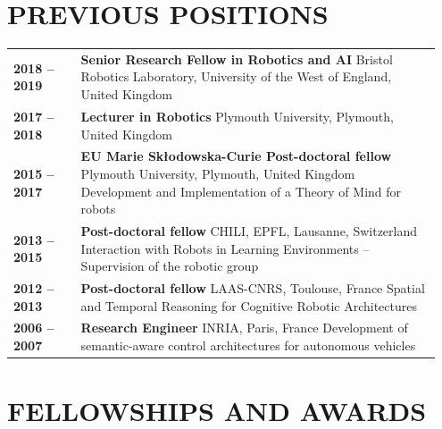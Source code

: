 \documentclass[11pt,a4paper]{report}
\begin{document}
\section{PREVIOUS POSITIONS}

\begin{tabular}{p{0.15\linewidth}p{0.8\linewidth}}
    \bf 2018 -- 2019 & {\bf Senior Research Fellow in Robotics and AI} \newline Bristol Robotics Laboratory, University of the West of England, United Kingdom \\
    \bf 2017 -- 2018 & {\bf Lecturer in Robotics} \newline Plymouth University, Plymouth, United Kingdom \\
    \bf 2015 -- 2017 & {\bf EU Marie Skłodowska-Curie Post-doctoral fellow}
    \newline Plymouth University, Plymouth, United Kingdom \newline \small
    Development and Implementation of a Theory of Mind for robots \\
    \bf 2013 -- 2015 & {\bf Post-doctoral fellow} \newline CHILI, EPFL,
    Lausanne, Switzerland \newline \small Interaction with Robots in Learning
    Environments – Supervision of the robotic group \\
    \bf 2012 -- 2013 & {\bf Post-doctoral fellow} \newline LAAS-CNRS, Toulouse,
    France \newline \small Spatial and Temporal Reasoning for Cognitive Robotic
    Architectures\\
    \bf 2006 -- 2007 & {\bf Research Engineer} \newline INRIA, Paris, France
    \newline \small Development of semantic-aware control architectures for
    autonomous vehicles \\
\end{tabular}


\section{FELLOWSHIPS AND AWARDS}
\end{document}

